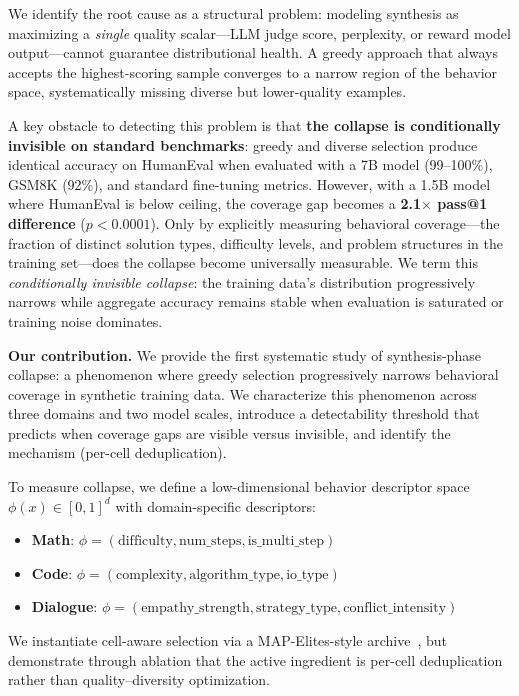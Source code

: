 \documentclass{article}
\begin{document}
We identify the root cause as a structural problem: modeling synthesis as maximizing a \emph{single} quality scalar---LLM judge score, perplexity, or reward model output---cannot guarantee distributional health. A greedy approach that always accepts the highest-scoring sample converges to a narrow region of the behavior space, systematically missing diverse but lower-quality examples.

A key obstacle to detecting this problem is that \textbf{the collapse is conditionally invisible on standard benchmarks}: greedy and diverse selection produce identical accuracy on HumanEval when evaluated with a 7B model (99--100\%), GSM8K (92\%), and standard fine-tuning metrics.
However, with a 1.5B model where HumanEval is below ceiling, the coverage gap becomes a \textbf{2.1$\times$ pass@1 difference} ($p{<}0.0001$).
Only by explicitly measuring behavioral coverage---the fraction of distinct solution types, difficulty levels, and problem structures in the training set---does the collapse become universally measurable.
We term this \emph{conditionally invisible collapse}: the training data's distribution progressively narrows while aggregate accuracy remains stable when evaluation is saturated or training noise dominates.

\textbf{Our contribution.}
We provide the first systematic study of synthesis-phase collapse: a phenomenon where greedy selection progressively narrows behavioral coverage in synthetic training data.
We characterize this phenomenon across three domains and two model scales, introduce a detectability threshold that predicts when coverage gaps are visible versus invisible, and identify the mechanism (per-cell deduplication).

To measure collapse, we define a low-dimensional behavior descriptor space $\phi(x) \in [0,1]^d$ with domain-specific descriptors:
\begin{itemize}[nosep]
  \item \textbf{Math}: $\phi = (\text{difficulty}, \text{num\_steps}, \text{is\_multi\_step})$
  \item \textbf{Code}: $\phi = (\text{complexity}, \text{algorithm\_type}, \text{io\_type})$
  \item \textbf{Dialogue}: $\phi = (\text{empathy\_strength}, \text{strategy\_type}, \text{conflict\_intensity})$
\end{itemize}

We instantiate cell-aware selection via a MAP-Elites-style archive~\citep{mouret_2015, map_elites_survey_2023}, but demonstrate through ablation that the active ingredient is per-cell deduplication rather than quality--diversity optimization.
\end{document}
